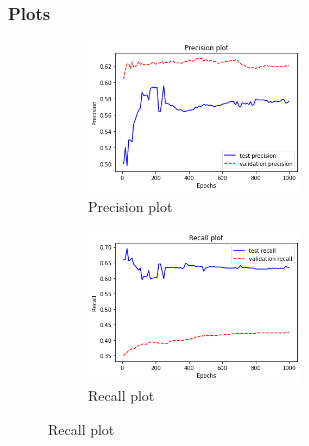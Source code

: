 \subsubsection{Plots}
\begin{figure}[h]
    \centering
    \begin{subfigure}[b]{0.5\textwidth}
                \includegraphics[width=\textwidth,height=4cm]{tex/img/precision_plot.png}
                \caption{Precision plot}
        \end{subfigure}%
        \hfill
    \begin{subfigure}[b]{0.5\textwidth}
                \includegraphics[width=\textwidth,height=4cm]{tex/img/recall_plot.png}
                \caption{Recall plot}
       \end{subfigure}%
    \end{figure}
